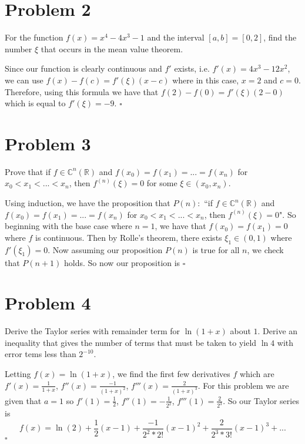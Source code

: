 \documentclass[12pt]{article}
\newcommand{\C}{\mathbb{C}}
\newcommand{\R}{\mathbb{R}}
\newenvironment{proof}{\noindent{\bf Proof.}}{\hfill $\square$\medskip}
\begin{document}
\newpage
\section{Problem 2}
For the function $f(x)=x^{4}-4x^{3}-1$ and the interval $[a,b]=[0,2]$, find the number $\xi$ that occurs in the mean value theorem.

\begin{proof}
Since our function is clearly continuous and $f'$ exists, i.e. $f'(x)=4x^{3}-12x^{2}$, we can use $f(x)-f(c)=f'(\xi)(x-c)$ where in this case, $x=2$ and $c=0$. Therefore, using this formula we have that $f(2)-f(0)=f'(\xi)(2-0)$ which is equal to $f'(\xi)=-9$.
\end{proof}

\section{Problem 3}
Prove that if $f\in \C^{n}(\R)$ and $f(x_{0})=f(x_{1})=...=f(x_{n})$ for $x_{0}<x_{1}<...<x_{n}$, then $f^{(n)}(\xi)=0$ for some $\xi\in(x_{0},x_{n})$.

\begin{proof}
Using induction, we have the proposition that $P(n):$ ``if $f\in \C^{n}(\R)$ and $f(x_{0})=f(x_{1})=...=f(x_{n})$ for $x_{0}<x_{1}<...<x_{n}$, then $f^{(n)}(\xi)=0$". So beginning with the base case where $n=1$, we have that $f(x_{0})=f(x_{1})=0$ where $f$ is continuous. Then by Rolle's theorem, there exists $\xi_{1}\in (0,1)$ where $f'(\xi_{1})=0$. Now assuming our proposition $P(n)$ is true for all $n$, we check that $P(n+1)$ holds. So now our proposition is
\end{proof}

\section{Problem 4}
Derive the Taylor series with remainder term for $\ln(1+x)$ about $1$. Derive an inequality that gives the number of terms that must be taken to yield $\ln4$ with error tems less than $2^{-10}$.

\begin{proof}
Letting $f(x)=\ln(1+x)$, we find the first few derivatives $f$ which are $f'(x)=\frac{1}{1+x}$, $f''(x)=\frac{-1}{(1+x)^{2}}$, $f'''(x)=\frac{2}{(1+x)^{3}}$. For this problem we are given that $a=1$ so $f'(1)=\frac{1}{2}$, $f''(1)=-\frac{1}{2^{2}}$, $f'''(1)=\frac{2}{2^{3}}$. So our Taylor series is $$f(x)=\ln(2)+\frac{1}{2}(x-1)+\frac{-1}{2^{2}*2!}(x-1)^{2}+\frac{2}{2^{3}*3!}(x-1)^{3}+...$$
\end{proof}
\end{document}
